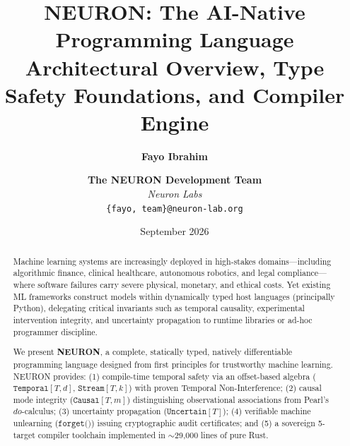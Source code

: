 \documentclass[11pt,twocolumn]{article}
\title{\textbf{NEURON: The AI-Native Programming Language\\Architectural Overview, Type Safety Foundations, and Compiler Engine}}
\author{
  \textbf{Fayo Ibrahim} \and \textbf{The NEURON Development Team} \\
  \textit{Neuron Labs} \\
  \texttt{\{fayo, team\}@neuron-lab.org}
}
\date{September 2026}
\begin{document}
\maketitle

\begin{abstract}
Machine learning systems are increasingly deployed in high-stakes domains—including algorithmic finance, clinical healthcare, autonomous robotics, and legal compliance—where software failures carry severe physical, monetary, and ethical costs. Yet existing ML frameworks construct models within dynamically typed host languages (principally Python), delegating critical invariants such as temporal causality, experimental intervention integrity, and uncertainty propagation to runtime libraries or ad-hoc programmer discipline.

We present \textbf{NEURON}, a complete, statically typed, natively differentiable programming language designed from first principles for trustworthy machine learning. NEURON provides: (1) compile-time temporal safety via an offset-based algebra ($\texttt{Temporal}[T, d]$, $\texttt{Stream}[T, k]$) with proven Temporal Non-Interference; (2) causal mode integrity ($\texttt{Causal}[T, m]$) distinguishing observational associations from Pearl's $do$-calculus; (3) uncertainty propagation ($\texttt{Uncertain}[T]$); (4) verifiable machine unlearning ($\texttt{forget()}$) issuing cryptographic audit certificates; and (5) a sovereign 5-target compiler toolchain implemented in $\sim$29,000 lines of pure Rust.
\end{abstract}
\end{document}
